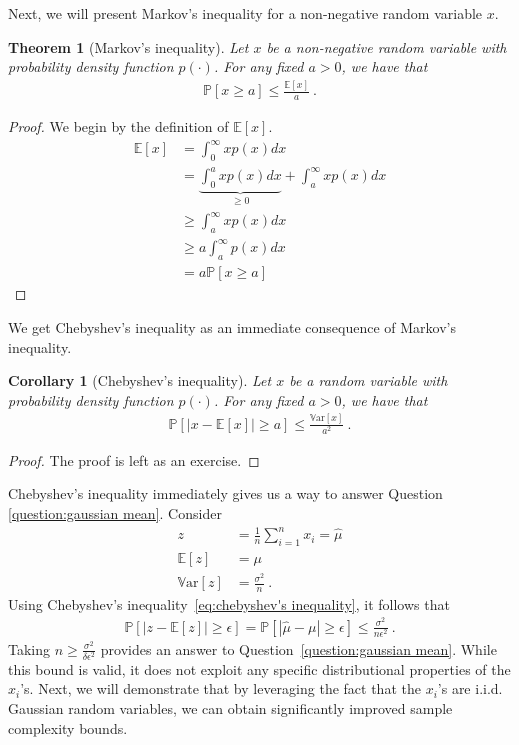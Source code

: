 \documentclass[11pt]{article}
\newtheorem{theorem}{Theorem}
\newtheorem{corollary}{Corollary}
\newcommand{\E}[1]{\mathbb{E}\left[ #1 \right]}
\newcommand{\prob}[1]{\mathbb{P}\left[ #1 \right]}
\newcommand{\var}[1]{\mathbb{V}\text{ar}\left[ #1 \right]}
\newcommand{\abs}[1]{\left| #1 \right|}
\begin{document}
Next, we will present Markov's inequality for a non-negative random variable $x$.
\begin{theorem}[Markov's inequality]
    \label{thm:markov's inequality}
    Let $x$ be a non-negative random variable with probability density function $p(\cdot)$. For any fixed $a > 0$, we have that
    \begin{align}
        \label{eq:markov's inequality}
        \prob{x \geq a} \leq \frac{\E{x}}{a}~.
    \end{align}
\end{theorem}
\begin{proof}
    We begin by the definition of $\E{x}$.
    \begin{align}
        \E{x} &= \int_{0}^\infty x p(x) dx \\
        &= \underbrace{\int_{0}^a x p(x) dx}_{\geq 0} + \int_{a}^\infty x p(x) dx \\
        &\geq \int_{a}^\infty x p(x) dx \\
        &\geq a\int_{a}^\infty  p(x) dx\\
        &= a \prob{x \geq a}
    \end{align}
\end{proof}
We get Chebyshev's inequality as an immediate consequence of Markov's inequality.
\begin{corollary}[Chebyshev's inequality]
    \label{thm:chebyshev's inequality}
    Let $x$ be a random variable with probability density function $p(\cdot)$. For any fixed $a > 0$, we have that
    \begin{align}
        \label{eq:chebyshev's inequality}
        \prob{\abs{x - \E{x}} \geq a} \leq \frac{\var{x}}{a^2}~.
    \end{align}
\end{corollary}
\begin{proof}
    The proof is left as an exercise.
\end{proof}
Chebyshev's inequality immediately gives us a way to answer Question \ref{question:gaussian mean}. Consider 
\begin{align}
    z &= \frac{1}{n} \sum_{i=1}^n x_i = \hat{\mu} \\
    \E{z} &= \mu \\
    \var{z} &= \frac{\sigma^2}{n}~.
\end{align}
Using Chebyshev's inequality~\eqref{eq:chebyshev's inequality}, it follows that
\begin{align}
    \prob{\abs{z - \E{z}} \geq \epsilon} = \prob{\abs{\hat{\mu} - \mu} \geq \epsilon} \leq \frac{\sigma^2}{n \epsilon^2}~.
\end{align}
Taking $n \geq \frac{\sigma^2}{\delta \epsilon^2}$ provides an answer to  Question~\ref{question:gaussian mean}. While this bound is valid, it does not exploit any specific distributional properties of the $x_i$'s. Next, we will demonstrate that by leveraging the fact that the $x_i$'s are i.i.d. Gaussian random variables, we can obtain significantly improved sample complexity bounds.
\end{document}
